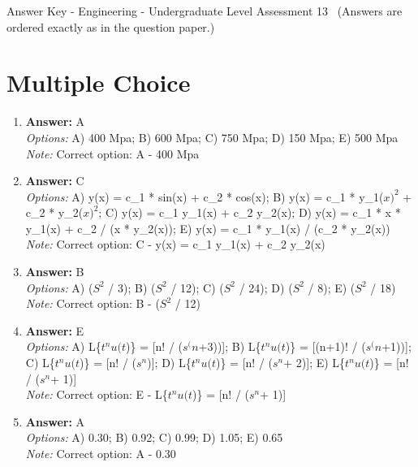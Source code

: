 \documentclass[12pt]{article}
\begin{document}
\begin{center}
Answer Key - Engineering - Undergraduate Level Assessment 13 \
\small (Answers are ordered exactly as in the question paper.)
\end{center}

\section*{Multiple Choice}
\begin{enumerate}[label=\arabic*.]
\item \textbf{Answer:} A
\\ \textit{Options:} A) 400 Mpa; B) 600 Mpa; C) 750 Mpa; D) 150 Mpa; E) 500 Mpa
\\ \textit{Note:} Correct option: A - 400 Mpa
\item \textbf{Answer:} C
\\ \textit{Options:} A) y(x) = c\_1 * sin(x) + c\_2 * cos(x); B) y(x) = c\_1 * y\_1($x)^2$ + c\_2 * y\_2($x)^2$; C) y(x) = c\_1 y\_1(x) + c\_2 y\_2(x); D) y(x) = c\_1 * x * y\_1(x) + c\_2 / (x * y\_2(x)); E) y(x) = c\_1 * y\_1(x) / (c\_2 * y\_2(x))
\\ \textit{Note:} Correct option: C - y(x) = c\_1 y\_1(x) + c\_2 y\_2(x)
\item \textbf{Answer:} B
\\ \textit{Options:} A) ($S^2$ / 3); B) ($S^2$ / 12); C) ($S^2$ / 24); D) ($S^2$ / 8); E) ($S^2$ / 18)
\\ \textit{Note:} Correct option: B - ($S^2$ / 12)
\item \textbf{Answer:} E
\\ \textit{Options:} A) L\{$t^nu(t$)\} = [n! / ($s^(n$+3))]; B) L\{$t^nu(t$)\} = [(n+1)! / ($s^(n$+1))]; C) L\{$t^nu(t$)\} = [n! / ($s^n$)]; D) L\{$t^nu(t$)\} = [n! / ($s^n$+ 2)]; E) L\{$t^nu(t$)\} = [n! / ($s^n$+ 1)]
\\ \textit{Note:} Correct option: E - L\{$t^nu(t$)\} = [n! / ($s^n$+ 1)]
\item \textbf{Answer:} A
\\ \textit{Options:} A) 0.30; B) 0.92; C) 0.99; D) 1.05; E) 0.65
\\ \textit{Note:} Correct option: A - 0.30
\end{enumerate}
\end{document}
